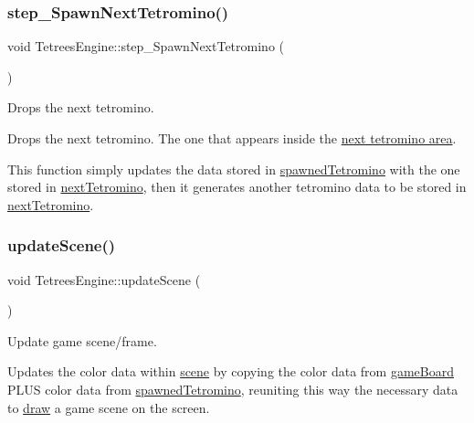 \subsubsection{\texorpdfstring{step\+\_\+\+Spawn\+Next\+Tetromino()}{step\_SpawnNextTetromino()}}
{\footnotesize\ttfamily void Tetrees\+Engine\+::step\+\_\+\+Spawn\+Next\+Tetromino (\begin{DoxyParamCaption}{ }\end{DoxyParamCaption})\hspace{0.3cm}{\ttfamily [private]}}



Drops the next tetromino. 

Drops the next tetromino. The one that appears inside the \hyperlink{TetreesUI_8cpp_aac997784ac88b494498d6e08d6fe62d5}{next tetromino area}.

This function simply updates the data stored in \hyperlink{classTetreesEngine_a26435ee2f02d9ba70d9e359745114f6e}{spawned\+Tetromino} with the one stored in \hyperlink{classTetreesEngine_a44c902481f5d8a72ca8a78d24f5c3a33}{next\+Tetromino}, then it generates another tetromino data to be stored in \hyperlink{classTetreesEngine_a44c902481f5d8a72ca8a78d24f5c3a33}{next\+Tetromino}. \mbox{\label{classTetreesEngine_a9aa3eec9561623f77eab13298ddad13c}} 
\subsubsection{\texorpdfstring{update\+Scene()}{updateScene()}}
{\footnotesize\ttfamily void Tetrees\+Engine\+::update\+Scene (\begin{DoxyParamCaption}{ }\end{DoxyParamCaption})\hspace{0.3cm}{\ttfamily [private]}}



Update game scene/frame. 

Updates the color data within \hyperlink{classTetreesEngine_aeade477c0bc2eaaa894ebbdaca93584e}{scene} by copying the color data from \hyperlink{classTetreesEngine_a37d082a7816d6731b2703dd6d1a1cb97}{game\+Board} P\+L\+US color data from \hyperlink{classTetreesEngine_a26435ee2f02d9ba70d9e359745114f6e}{spawned\+Tetromino}, reuniting this way the necessary data to \hyperlink{classTetreesUI_a357ae7240cc5f35b5d61244e7a6bcfe3}{draw} a game scene on the screen. 

